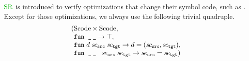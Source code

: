 $\SREL$ is introduced to verify optimizations that change their symbol code, such as .
Except for those optimizations, we always use the following trivial quadruple.
\[
\begin{array}{l@{}l}
(&\Skel \times \Skel, \\
&\code{fun \_\,\_} \rightarrow \top, \\
&\code{fun} \; \srel \; \skel_\src \; \skel_\tgt \rightarrow \srel = (\skel_\src, \skel_\tgt), \\
&\code{fun \_\,\_ } \; \skenv_\src \; \skenv_\tgt \rightarrow \skenv_\src = \skenv_\tgt) \\
\end{array}
\]



